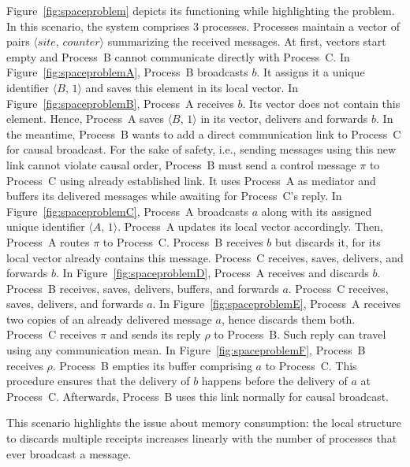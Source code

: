 Figure~\ref{fig:spaceproblem} depicts its functioning while highlighting the
problem. In this scenario, the system comprises 3 processes. Processes maintain
a vector of pairs $\langle site,\, counter \rangle$ summarizing the received
messages. At first, vectors start empty and Process~B cannot communicate
directly with Process~C. In Figure~\ref{fig:spaceproblemA}, Process~B broadcasts
$b$. It assigns it a unique identifier $\langle B,\, 1 \rangle$ and saves this
element in its local vector. In Figure~\ref{fig:spaceproblemB}, Process~A
receives $b$. Its vector does not contain this element. Hence, Process~A saves
$\langle B,\,1\rangle$ in its vector, delivers and forwards $b$. In the
meantime, Process~B wants to add a direct communication link to Process~C for
causal broadcast. For the sake of safety, i.e., sending messages using this new
link cannot violate causal order, Process~B must send a control message $\pi$ to
Process~C using already established link. It uses Process~A as mediator and
buffers its delivered messages while awaiting for Process~C's reply. In
Figure~\ref{fig:spaceproblemC}, Process~A broadcasts $a$ along with its assigned
unique identifier $\langle A,\, 1 \rangle$. Process~A updates its local vector
accordingly. Then, Process~A routes $\pi$ to Process~C. Process~B receives $b$
but discards it, for its local vector already contains this message.  Process~C
receives, saves, delivers, and forwards $b$. In Figure~\ref{fig:spaceproblemD},
Process~A receives and discards $b$. Process~B receives, saves, delivers,
buffers, and forwards $a$. Process~C receives, saves, delivers, and forwards
$a$. In Figure~\ref{fig:spaceproblemE}, Process~A receives two copies of an
already delivered message $a$, hence discards them both. Process~C receives
$\pi$ and sends its reply $\rho$ to Process~B. Such reply can travel using any
communication mean. In Figure~\ref{fig:spaceproblemF}, Process~B receives
$\rho$. Process~B empties its buffer comprising $a$ to Process~C. This procedure
ensures that the delivery of $b$ happens before the delivery of $a$ at
Process~C. Afterwards, Process~B uses this link normally for causal broadcast.

This scenario highlights the issue about memory consumption: the local structure
to discards multiple receipts increases linearly with the number of processes
that ever broadcast a message.

